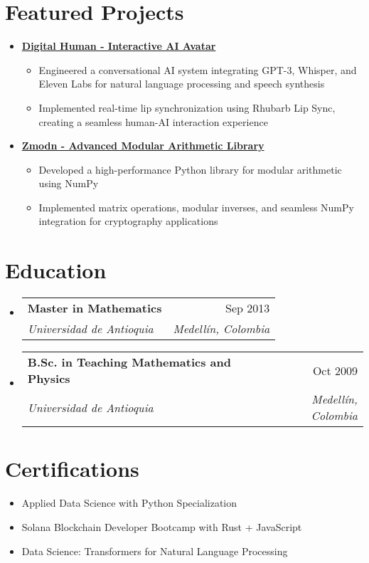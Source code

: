 \documentclass[letterpaper,11pt]{article}
\makeatletter
\newcommand{\resumeSubheading}[4]{
  \vspace{-2pt}
  \item[]
  \begin{tabular*}{\textwidth}{@{\extracolsep{\fill}}l r}
    \textbf{#1} & #2 \\
    \textit{#3} & \textit{#4} \\
  \end{tabular*}
  \vspace{-5pt}
}
\makeatother
\begin{document}
\section{Featured Projects}
\begin{itemize}[leftmargin=*]
    \item \textbf{\href{https://github.com/asanchezyali/talking-avatar-with-ai}{Digital Human - Interactive AI Avatar \faExternalLink}}
    \begin{itemize}
        \item Engineered a conversational AI system integrating GPT-3, Whisper, and Eleven Labs for natural language processing and speech synthesis
        \item Implemented real-time lip synchronization using Rhubarb Lip Sync, creating a seamless human-AI interaction experience
    \end{itemize}
    
    \item \textbf{\href{https://github.com/asanchezyali/zmodn}{Zmodn - Advanced Modular Arithmetic Library \faExternalLink}}
    \begin{itemize}
        \item Developed a high-performance Python library for modular arithmetic using NumPy
        \item Implemented matrix operations, modular inverses, and seamless NumPy integration for cryptography applications
    \end{itemize}
\end{itemize}

\section{Education}
\begin{itemize}[leftmargin=0pt, itemindent=0pt, label={}]
\resumeSubheading
{Master in Mathematics}{Sep 2013}
{Universidad de Antioquia}{Medellín, Colombia}

\resumeSubheading
{B.Sc. in Teaching Mathematics and Physics}{Oct 2009}
{Universidad de Antioquia}{Medellín, Colombia}
\end{itemize}

\section{Certifications}
\begin{itemize}[leftmargin=*]
    \item Applied Data Science with Python Specialization
    \item Solana Blockchain Developer Bootcamp with Rust + JavaScript
    \item Data Science: Transformers for Natural Language Processing
\end{itemize}
\end{document}
